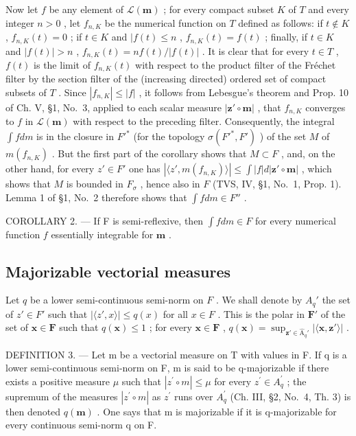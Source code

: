 Now let \(f\) be any element of \(\mathcal{L}(\mathbf{m})\) ; for every compact subset \(K\) of \(T\) and every integer \(n > 0\) , let \(f_{n,K}\) be the numerical function on \(T\) defined as follows: if \(t \notin K\) , \(f_{n,K}(t) = 0\) ; if \(t \in K\) and \(|f(t) \leqslant n\) , \(f_{n,K}(t) = f(t)\) ; finally, if \(t \in K\) and \(|f(t)| > n\) , \(f_{n,K}(t) = nf(t)/|f(t)|\) . It is clear that for every \(t \in T\) , \(f(t)\) is the limit of \(f_{n,K}(t)\) with respect to the product filter of the Fréchet filter by the section filter of the (increasing directed) ordered set of compact subsets of \(T\) . Since \(|f_{n,K}| \leqslant |f|\) , it follows from Lebesgue's theorem and Prop. 10 of Ch. V, §1, No.~3, applied to each scalar measure \(|\mathbf{z}' \circ \mathbf{m}|\) , that \(f_{n,K}\) converges to \(f\) in \(\mathcal{L}(\mathbf{m})\) with respect to the preceding filter. Consequently, the integral \(\int f dm\) is in the closure in \(F'^*\) (for the topology \(\sigma(F'^*, F')\) ) of the set \(M\) of \(m(f_{n,K})\) . But the first part of the corollary shows that \(M \subset F\) , and, on the other hand, for every \(z' \in F'\) one has \(|\langle z', m(f_{n,K})\rangle| \leqslant \int |f| d|\mathbf{z}' \circ \mathbf{m}|\) , which shows that \(M\) is bounded in \(F_\sigma\) , hence also in \(F\) (TVS, IV, §1, No.~1, Prop. 1). Lemma 1 of §1, No.~2 therefore shows that \(\int f dm \in F''\) .

COROLLARY 2. --- If F is semi-reflexive, then \(\int f dm \in F\) for every numerical function \(f\) essentially integrable for \(\mathbf{m}\) .

\subsection{Majorizable vectorial measures}

Let \(q\) be a lower semi-continuous semi-norm on \(F\) . We shall denote by \(A_q'\) the set of \(z' \in F'\) such that \(|\langle z', x \rangle| \leqslant q(x)\) for all \(x \in F\) . This is the polar in \(\mathbf{F}'\) of the set of \(\mathbf{x} \in \mathbf{F}\) such that \(q(\mathbf{x}) \leqslant 1\) ; for every \(\mathbf{x} \in \mathbf{F}\) , \(q(\mathbf{x}) = \sup_{\mathbf{z}' \in \hat{\mathrm{A}}_q'} |\langle \mathbf{x}, \mathbf{z}' \rangle|\) .

DEFINITION 3. --- Let m be a vectorial measure on T with values in F. If q is a lower semi-continuous semi-norm on F, m is said to be q-majorizable if there exists a positive measure \(\mu\) such that \(|z^{\prime} \circ m| \leqslant \mu\) for every \(z^{\prime} \in A_{q}^{\prime}\) ; the supremum of the measures \(|z^{\prime} \circ m|\) as \(z^{\prime}\) runs over \(A_{q}^{\prime}\) (Ch. III, §2, No.~4, Th. 3) is then denoted \(q(\mathbf{m})\) . One says that m is majorizable if it is q-majorizable for every continuous semi-norm q on F.

